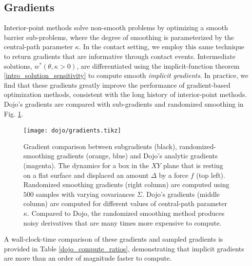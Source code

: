 \subsection{Gradients} 

Interior-point methods solve non-smooth problems by optimizing a  smooth barrier sub-problems, where the degree of smoothing is parameterized by the central-path parameter $\kappa$. In the contact setting, we employ this same technique to return gradients that are informative through contact events. Intermediate solutions, $w^*(\theta, \kappa > 0)$, are differentiated using the implicit-function theorem \eqref{intro_solution_sensitivity} to compute smooth \textit{implicit gradients}. In practice, we find that these gradients greatly improve the performance of gradient-based optimization methods, consistent with the long history of interior-point methods. Dojo's gradients are compared with sub-gradients and randomized smoothing in Fig. \ref{dojo_gradient_compare}. 

\begin{figure}[H]
	\centering
	\texttt{[image: dojo/gradients.tikz]}
	\caption[Gradient comparison for Dojo implicit gradients and gradient bundles]{Gradient comparison between subgradients (black), randomized-smoothing gradients \cite{suh2022bundled} (orange, blue) and Dojo's analytic gradients (magenta). The dynamics for a box in the $XY$ plane that is resting on a flat surface and displaced an amount $\Delta$ by a force $f$ (top left). Randomized smoothing gradients (right column) are computed using $500$ samples with varying covariances $\Sigma$. Dojo's gradients (middle column) are computed for different values of central-path parameter $\kappa$. Compared to Dojo, the randomized smoothing method produces noisy derivatives that are many times more expensive to compute.}
	\label{dojo_gradient_compare}
\end{figure}

A wall-clock-time comparison of these gradients and sampled gradients is provided in Table \ref{dojo_compute_ratios}, demonstrating that implicit gradients are more than an order of magnitude faster to compute.

